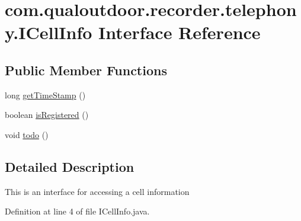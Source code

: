 \hypertarget{interfacecom_1_1qualoutdoor_1_1recorder_1_1telephony_1_1ICellInfo}{\section{com.\-qualoutdoor.\-recorder.\-telephony.\-I\-Cell\-Info Interface Reference}
\label{interfacecom_1_1qualoutdoor_1_1recorder_1_1telephony_1_1ICellInfo}
}
\subsection*{Public Member Functions}
\begin{DoxyCompactItemize}
\item 
long \hyperlink{interfacecom_1_1qualoutdoor_1_1recorder_1_1telephony_1_1ICellInfo_a20aaca32b7aad64bca27b703e4f6dbb5}{get\-Time\-Stamp} ()
\item 
boolean \hyperlink{interfacecom_1_1qualoutdoor_1_1recorder_1_1telephony_1_1ICellInfo_aced3d6782e7e962ab4a92e2e8af5e280}{is\-Registered} ()
\item 
void \hyperlink{interfacecom_1_1qualoutdoor_1_1recorder_1_1telephony_1_1ICellInfo_a99a2515d30d7a0b7c667e23690fb5d09}{todo} ()
\end{DoxyCompactItemize}


\subsection{Detailed Description}
This is an interface for accessing a cell information 

Definition at line 4 of file I\-Cell\-Info.\-java.



